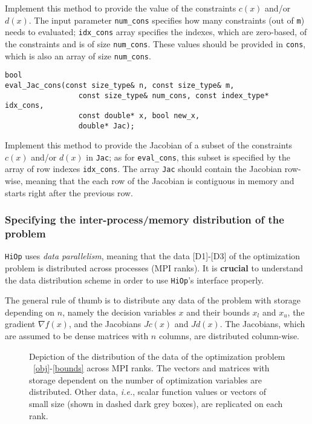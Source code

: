 \documentclass[11pt]{article}
\newcommand{\Hi}{\texttt{HiOp}\xspace}
\begin{document}
\noindent Implement this method to provide the value of the constraints $c(x)$ and/or $d(x)$. The input parameter \texttt{num\_cons} specifies how many constraints (out of \texttt{m}) needs to evaluated; \texttt{idx\_cons} array specifies the indexes, which are zero-based, of the constraints  and is of size \texttt{num\_cons}. These values should be provided in \texttt{cons}, which is also an array of size \texttt{num\_cons}.

\begin{lstlisting} 
bool 
eval_Jac_cons(const size_type& n, const size_type& m, 
			     const size_type& num_cons, const index_type* idx_cons,  
			     const double* x, bool new_x,
			     double* Jac);
\end{lstlisting} 

\noindent Implement this method to provide the Jacobian of a subset of the  constraints $c(x)$ and/or $d(x)$ in \texttt{Jac}; as for \texttt{eval\_cons}, this subset is specified by the array of row indexes \texttt{idx\_cons}. The array \texttt{Jac} should contain the Jacobian row-wise, meaning that the each row of the Jacobian is contiguous in memory and starts right after the previous row.


\subsubsection{Specifying the inter-process/memory distribution of the   problem}

\Hi uses \textit{data parallelism}, meaning that the data [D1]-[D3] of the optimization problem is distributed across processes (MPI ranks). It is \textbf{crucial} to understand the data distribution scheme in order to use \Hi's interface properly. 

The general rule of thumb is to distribute any data of the problem with storage depending on $n$, namely the decision variables $x$ and their bounds $x_l$ and $x_u$, the gradient $\nabla f(x)$, and the Jacobians $Jc(x)$ and $Jd(x)$. The Jacobians, which are assumed to be dense matrices with $n$ columns, are distributed column-wise.

\begin{figure}[h]
\centering

\caption{Depiction of the distribution of the data of the optimization problem ~\eqref{obj}-\eqref{bounds} across MPI ranks. The vectors and matrices with storage dependent on the number of optimization variables are distributed. Other data, \textit{i.e.}, scalar function values or vectors of small size (shown in dashed dark grey boxes), are replicated on each rank.}
\label{diagr_distrib}
\end{figure}
%
\end{document}
